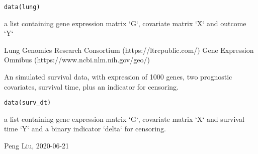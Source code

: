 \documentclass[a4paper]{book}
\begin{document}
%
\begin{Usage}
\begin{verbatim}
data(lung)
\end{verbatim}
\end{Usage}
%
\begin{Format}
a list containing gene expression matrix `G`, covariate matrix `X` and outcome `Y`
\end{Format}
%
\begin{Source}\relax
Lung Genomics Research Consortium (https://ltrcpublic.com/)
Gene Expression Omnibus (https://www.ncbi.nlm.nih.gov/geo/)
\end{Source}
%
\begin{Examples}
\end{Examples}
%
\begin{Description}\relax
An simulated survival data, with expression of 1000
genes, two prognostic covariates, survival time,
plus an indicator for censoring.
\end{Description}
%
\begin{Usage}
\begin{verbatim}
data(surv_dt)
\end{verbatim}
\end{Usage}
%
\begin{Format}
a list containing gene expression matrix `G`,
covariate matrix `X` and survival time `Y` and a binary
indicator `delta` for censoring.
\end{Format}
%
\begin{Author}\relax
Peng Liu, 2020-06-21
\end{Author}
\end{document}
